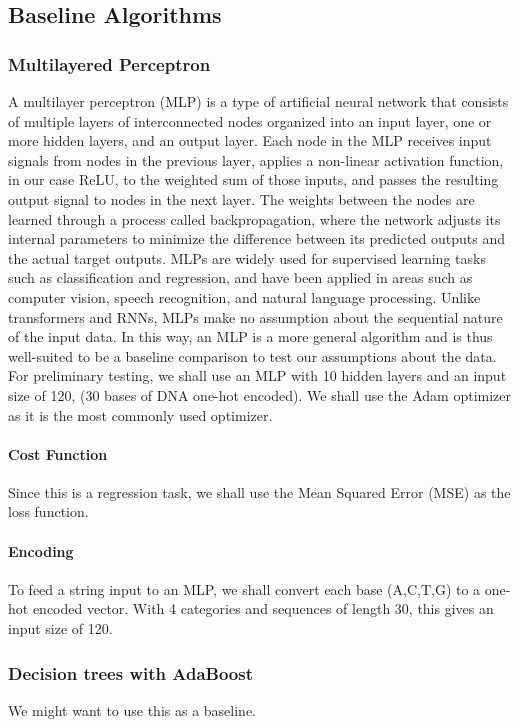 \documentclass{article}
\begin{document}
\subsection{Baseline Algorithms}

\subsubsection{Multilayered Perceptron}
A multilayer perceptron (MLP) is a type of artificial neural network that consists of multiple layers of interconnected nodes organized into an input layer, one or more hidden layers, and an output layer. Each node in the MLP receives input signals from nodes in the previous layer, applies a non-linear activation function, in our case ReLU, to the weighted sum of those inputs, and passes the resulting output signal to nodes in the next layer. The weights between the nodes are learned through a process called backpropagation, where the network adjusts its internal parameters to minimize the difference between its predicted outputs and the actual target outputs. MLPs are widely used for supervised learning tasks such as classification and regression, and have been applied in areas such as computer vision, speech recognition, and natural language processing. Unlike transformers and RNNs, MLPs make no assumption about the sequential nature of the input data. In this way, an MLP is a more general algorithm and is thus well-suited to be a baseline comparison to test our assumptions about the data. For preliminary testing, we shall use an MLP with 10 hidden layers and an input size of 120, (30 bases of DNA one-hot encoded). We shall use the Adam optimizer as it is the most commonly used optimizer.

\paragraph{Cost Function}
Since this is a regression task, we shall use the Mean Squared Error (MSE) as the loss function.

\paragraph{Encoding}
To feed a string input to an MLP, we shall convert each base (A,C,T,G) to a one-hot encoded vector. With 4 categories and sequences of length 30, this gives an input size of 120.


\subsubsection{Decision trees with AdaBoost}
We might want to use this as a baseline. 
\end{document}

